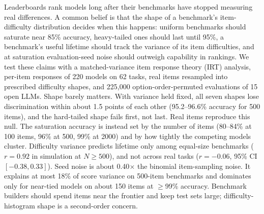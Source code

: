 Leaderboards rank models long after their benchmarks have stopped measuring real differences. A common belief is that the shape of a benchmark's item-difficulty distribution decides when this happens: uniform benchmarks should saturate near 85\% accuracy, heavy-tailed ones should last until 95\%, a benchmark's useful lifetime should track the variance of its item difficulties, and at saturation evaluation-seed noise should outweigh capability in rankings. We test these claims with a matched-variance item response theory (IRT) analysis, per-item responses of 220 \leaderboard models on 62 tasks, real items resampled into prescribed difficulty shapes, and 225{,}000 option-order-permuted evaluations of 15 open LLMs. Shape barely matters. With variance held fixed, all seven shapes lose discrimination within about 1.5 points of each other (95.2--96.6\% accuracy for 500 items), and the hard-tailed shape fails first, not last. Real items reproduce this null. The saturation accuracy is instead set by the number of items (80--84\% at 100 items, 96\% at 500, 99\% at 2000) and by how tightly the competing models cluster. Difficulty variance predicts lifetime only among equal-size benchmarks ($r{=}0.92$ in simulation at $N{\ge}500$), and not across real tasks ($r{=}{-}0.06$, 95\% CI $[-0.38, 0.33]$). Seed noise is about 0.40$\times$ the binomial item-sampling noise. It explains at most 18\% of score variance on 500-item benchmarks and dominates only for near-tied models on about 150 items at $\ge$99\% accuracy. Benchmark builders should spend items near the frontier and keep test sets large; difficulty-histogram shape is a second-order concern.
